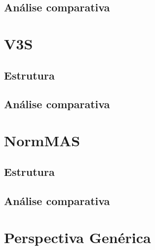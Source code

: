 \documentclass[openright]{normas-utf-tex} %
\begin{document}
		\subsection{Análise comparativa}

			

	\section{V3S}

		

		\subsection{Estrutura}

			

		\subsection{Análise comparativa}

			


	\section{NormMAS}

		

		\subsection{Estrutura}
		
			

		\subsection{Análise comparativa}

			
	\section{Perspectiva Genérica}

	

\label{chap:anacomp}
\end{document}
